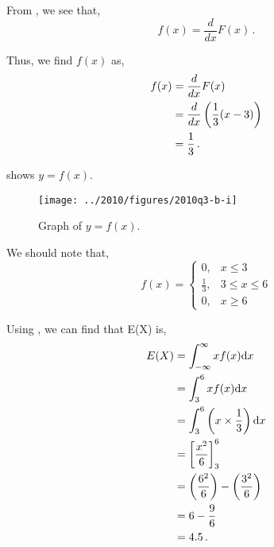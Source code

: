 \begin{subquestions}
\subquestion

\begin{subsubquestions}
	
\subsubquestion

From , we see that,
\begin{equation}
	f(x) = \frac{d}{dx}F(x) \,.
\end{equation}
	
Thus, we find $f(x)$ as,
\begin{align}
	f(x) & = \frac{d}{dx}F(x) \nonumber \\
	     & = \frac{d}{dx}\left(\frac{1}{3}(x-3) \right) \nonumber \\
	     & = \frac{1}{3} \,.
\end{align}

 shows $y=f(x)$.
\begin{figure}[H]
	\begin{center}
		\texttt{[image: ../2010/figures/2010q3-b-i]}
		\caption{\label{2010:q3:fig:fGraph} Graph of $y=f(x)$.}
	\end{center}
\end{figure}

We should note that,
\[ f(x) =\begin{cases} 
	0, & x \leq 3 \\
	\frac{1}{3}, & 3 \leq x \leq 6 \\
	0, & x \geq 6 
		\end{cases}
\]


\subsubquestion

Using , we can find that E(X) is,
\begin{align}
	E(X) & = \int_{-\infty}^{\infty}x f(x)\mathrm{d}x \nonumber \\
		 & = \int_{3}^{6}x f(x)\mathrm{d}x \nonumber \\
	     & = \int_{3}^{6} \left(x \times \frac{1}{3} \right)\mathrm{d}x\nonumber \\
	     & = \left[\frac{x^2}{6} \right]^{6}_{3} \nonumber \\
	     & = \left( \frac{6^2}{6} \right) - \left( \frac{3^2}{6} \right) \nonumber \\
	     & = 6 - \frac{9}{6} \nonumber \\
	     & = 4.5 \,.
\end{align}



\end{subsubquestions}
\end{subquestions}

